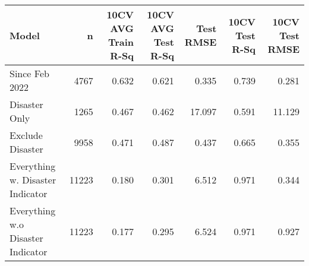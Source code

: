 
\begin{tabular}{l|r|r|r|r|r|r}
\hline
Model & n & 10CV AVG Train R-Sq & 10CV AVG Test R-Sq & Test RMSE & 10CV Test R-Sq & 10CV Test RMSE\\
\hline
Since Feb 2022 & 4767 & 0.632 & 0.621 & 0.335 & 0.739 & 0.281\\
\hline
Disaster Only & 1265 & 0.467 & 0.462 & 17.097 & 0.591 & 11.129\\
\hline
Exclude Disaster & 9958 & 0.471 & 0.487 & 0.437 & 0.665 & 0.355\\
\hline
Everything w. Disaster Indicator & 11223 & 0.180 & 0.301 & 6.512 & 0.971 & 0.344\\
\hline
Everything w.o Disaster Indicator & 11223 & 0.177 & 0.295 & 6.524 & 0.971 & 0.927\\
\hline
\end{tabular}
